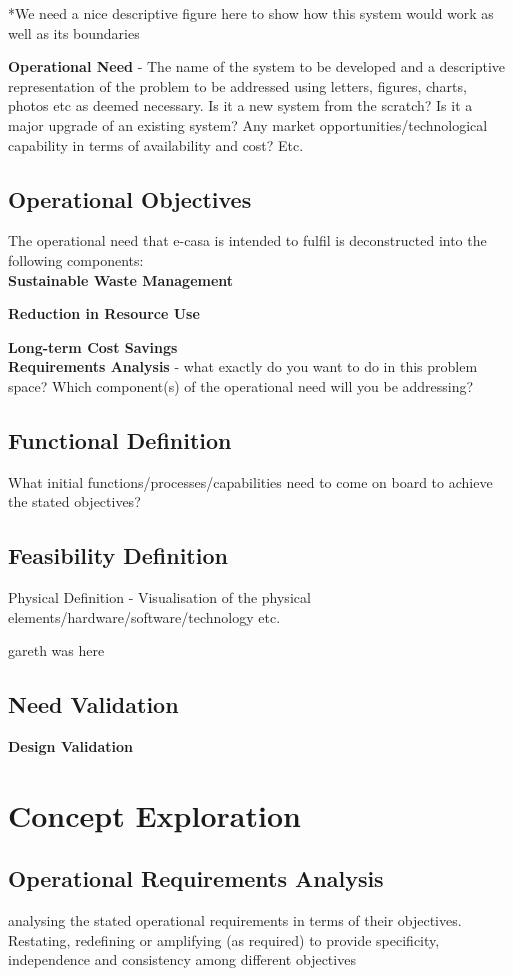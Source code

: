 \documentclass[a4paper,11pt,fleqn]{report}
\begin{document}
*We need a nice descriptive figure here to show how this system would work as well as its boundaries

\textbf{Operational Need} - The name of the system to be developed and a descriptive representation of the problem to be addressed using letters, figures, charts, photos etc as deemed necessary. Is it a new system from the scratch? Is it a major upgrade of an existing system? Any market opportunities/technological capability in terms of availability and cost? Etc.

\subsection{Operational Objectives}
The operational need that \ac{e-casa} is intended to fulfil is deconstructed into the following components:\\

\textbf{Sustainable Waste Management}

\textbf{Reduction in Resource Use}

\textbf{Long-term Cost Savings}\\


\textbf{Requirements Analysis} - what exactly do you want to do in this problem space? Which component(s) of the operational need will you be addressing?

\subsection{Functional Definition}
What initial functions/processes/capabilities need to come on board to
achieve the stated objectives?

\subsection{Feasibility Definition}
Physical Definition - Visualisation of the physical elements/hardware/software/technology
etc. 

gareth was here

\subsection{Need Validation}
\textbf{Design Validation}

\section{Concept Exploration}
\subsection{Operational Requirements Analysis}
analysing the stated operational requirements in terms of their
objectives. Restating, redefining or amplifying (as required) to provide
specificity, independence and consistency among different
objectives
\end{document}
